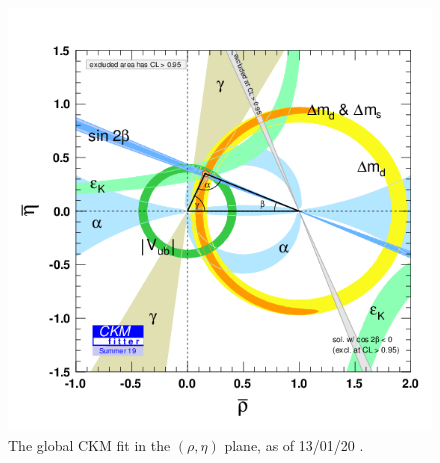 \documentclass[a4paper,12pt]{article}
\begin{document}
\begin{figure}[H]
    \centering
    \includegraphics[scale=0.5]{rhoeta_large.png}
    \caption{\label{fig:ckmfitter} The global CKM fit in the $(\rho,\eta)$ plane, as of 13/01/20 \cite{ckm}.}
\end{figure}
\end{document}
